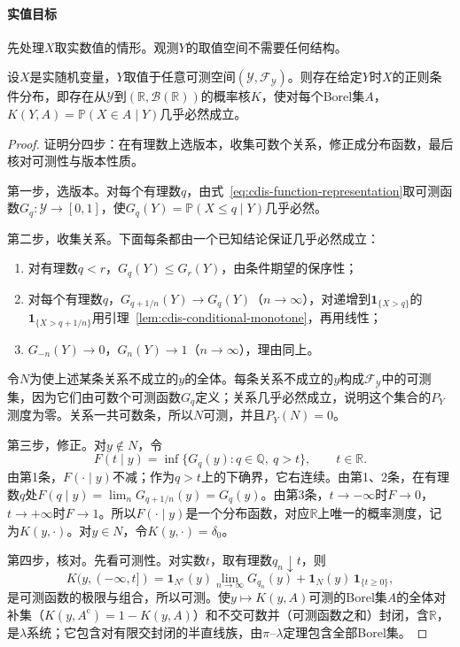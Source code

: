 \paragraph{实值目标}
先处理$X$取实数值的情形。观测$Y$的取值空间不需要任何结构。

\begin{theorem}[实值随机变量的正则条件分布]
\label{thm:cdis-existence-real}
设$X$是实随机变量，$Y$取值于任意可测空间$(\mathcal{Y},\mathcal{F}_{\mathcal{Y}})$。则存在给定$Y$时$X$的正则条件分布，即存在从$\mathcal{Y}$到$(\mathbb{R},\mathcal{B}(\mathbb{R}))$的概率核$K$，使对每个Borel集$A$，$K(Y,A)=\mathbb{P}(X\in A\mid Y)$几乎必然成立。
\end{theorem}

\begin{proof}
证明分四步：在有理数上选版本，收集可数个关系，修正成分布函数，最后核对可测性与版本性质。

第一步，选版本。对每个有理数$q$，由式~\eqref{eq:cdis-function-representation}取可测函数$G_q:\mathcal{Y}\to[0,1]$，使$G_q(Y)=\mathbb{P}(X\leq q\mid Y)$几乎必然。

第二步，收集关系。下面每条都由一个已知结论保证几乎必然成立：
\begin{enumerate}
 \item 对有理数$q<r$，$G_q(Y)\leq G_r(Y)$，由条件期望的保序性；
 \item 对每个有理数$q$，$G_{q+1/n}(Y)\to G_q(Y)$（$n\to\infty$），对递增到$\mathbf{1}_{\{X>q\}}$的$\mathbf{1}_{\{X>q+1/n\}}$用引理~\ref{lem:cdis-conditional-monotone}，再用线性；
 \item $G_{-n}(Y)\to0$，$G_{n}(Y)\to1$（$n\to\infty$），理由同上。
\end{enumerate}
令$N$为使上述某条关系不成立的$y$的全体。每条关系不成立的$y$构成$\mathcal{F}_{\mathcal{Y}}$中的可测集，因为它们由可数个可测函数$G_q$定义；关系几乎必然成立，说明这个集合的$P_Y$测度为零。关系一共可数条，所以$N$可测，并且$P_Y(N)=0$。

第三步，修正。对$y\notin N$，令
\[
 F(t\mid y)=\inf\{G_q(y):q\in\mathbb{Q},\ q>t\},\qquad t\in\mathbb{R}.
\]
由第1条，$F(\cdot\mid y)$不减；作为$q>t$上的下确界，它右连续。由第1、2条，在有理数$q$处$F(q\mid y)=\lim_nG_{q+1/n}(y)=G_q(y)$。由第3条，$t\to-\infty$时$F\to0$，$t\to+\infty$时$F\to1$。所以$F(\cdot\mid y)$是一个分布函数，对应$\mathbb{R}$上唯一的概率测度，记为$K(y,\cdot)$。对$y\in N$，令$K(y,\cdot)=\delta_0$。

第四步，核对。先看可测性。对实数$t$，取有理数$q_n\downarrow t$，则
\[
 K(y,(-\infty,t])=\mathbf{1}_{N^{\mathrm{c}}}(y)\lim_{n\to\infty}G_{q_n}(y)+\mathbf{1}_{N}(y)\,\mathbf{1}_{\{t\geq0\}},
\]
是可测函数的极限与组合，所以可测。使$y\mapsto K(y,A)$可测的Borel集$A$的全体对补集（$K(y,A^{\mathrm{c}})=1-K(y,A)$）和不交可数并（可测函数之和）封闭，含$\mathbb{R}$，是$\lambda$系统；它包含对有限交封闭的半直线族，由$\pi$--$\lambda$定理包含全部Borel集。


\end{proof}

